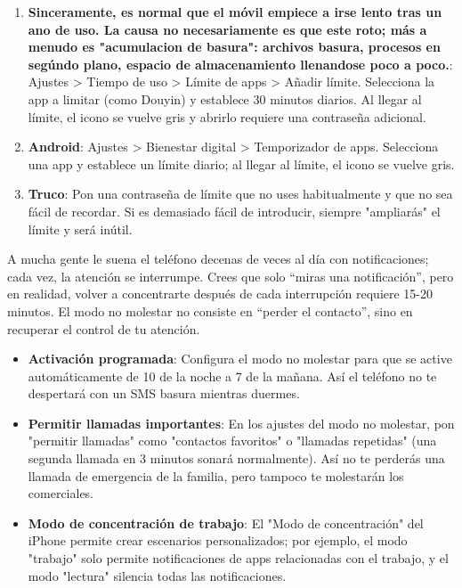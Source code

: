 \begin{enumerate}
  \item \textbf{Sinceramente, es normal que el móvil empiece a irse lento tras un ano de uso. La causa no necesariamente es que este roto; más a menudo es "acumulacion de basura": archivos basura, procesos en segúndo plano, espacio de almacenamiento llenandose poco a poco.}: Ajustes > Tiempo de uso > Límite de apps > Añadir límite. Selecciona la app a limitar (como Douyin) y establece 30 minutos diarios. Al llegar al límite, el icono se vuelve gris y abrirlo requiere una contraseña adicional.
  \item \textbf{Android}: Ajustes > Bienestar digital > Temporizador de apps. Selecciona una app y establece un límite diario; al llegar al límite, el icono se vuelve gris.
  \item \textbf{Truco}: Pon una contraseña de límite que no uses habitualmente y que no sea fácil de recordar. Si es demasiado fácil de introducir, siempre "ampliarás" el límite y será inútil.
\end{enumerate}


A mucha gente le suena el teléfono decenas de veces al día con notificaciones; cada vez, la atención se interrumpe. Crees que solo “miras una notificación”, pero en realidad, volver a concentrarte después de cada interrupción requiere 15-20 minutos. El modo no molestar no consiste en “perder el contacto”, sino en recuperar el control de tu atención.

\begin{itemize}
  \item \textbf{Activación programada}: Configura el modo no molestar para que se active automáticamente de 10 de la noche a 7 de la mañana. Así el teléfono no te despertará con un SMS basura mientras duermes.
  \item \textbf{Permitir llamadas importantes}: En los ajustes del modo no molestar, pon "permitir llamadas" como "contactos favoritos" o "llamadas repetidas" (una segunda llamada en 3 minutos sonará normalmente). Así no te perderás una llamada de emergencia de la familia, pero tampoco te molestarán los comerciales.
  \item \textbf{Modo de concentración de trabajo}: El "Modo de concentración" del iPhone permite crear escenarios personalizados; por ejemplo, el modo "trabajo" solo permite notificaciones de apps relacionadas con el trabajo, y el modo "lectura" silencia todas las notificaciones.
\end{itemize}

